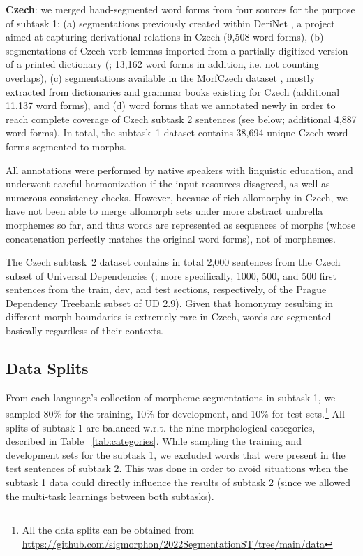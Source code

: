 \documentclass[11pt]{article}
\begin{document}
\textbf{Czech}: we merged hand-segmented word forms from four sources for the purpose of subtask 1:
(a) segmentations previously created within DeriNet \cite{derinet-2019}, a project aimed at capturing derivational relations in Czech  (9,508 word forms),
(b) segmentations of Czech verb lemmas imported from a partially digitized version of a printed dictionary (\citealt{slavickova-2017}; 13,162 word forms in addition, i.e. not counting overlaps),
(c) segmentations available in the MorfCzech dataset  \cite{morfoczech-data-2022}, mostly extracted from dictionaries and  grammar books existing for Czech (additional 11,137 word forms), and
(d) word forms that we annotated newly in order to reach complete coverage of Czech subtask 2 sentences (see below; additional 4,887 word forms). In total, the subtask~1 dataset contains 38,694 unique Czech word forms segmented to morphs.

All annotations were performed by native speakers with linguistic education, and underwent careful harmonization if the input resources disagreed, as well as numerous consistency checks. However, because of rich allomorphy in Czech, we have not been able to merge allomorph sets  under more abstract umbrella morphemes so far, and thus words are represented as sequences of morphs (whose concatenation perfectly matches the original word forms), not of morphemes. 

The Czech subtask~2 dataset contains in total 2,000 sentences from the Czech subset of Universal Dependencies (\citealt{ud-cl-2021}; more specifically, 1000, 500, and 500 first sentences from the train, dev, and test sections, respectively, of the Prague Dependency Treebank subset of UD 2.9). Given that homonymy resulting in different morph boundaries is extremely rare in Czech, words are segmented basically regardless of their contexts. 


\subsection{Data Splits}
From each language's collection of morpheme segmentations in subtask 1, we sampled 80\% for the training,  10\% for development, and 10\% for test sets.\footnote{All the data splits can be obtained from \url{ https://github.com/sigmorphon/2022SegmentationST/tree/main/data}} All splits of subtask 1 are balanced w.r.t. the nine morphological categories, described in Table~ \ref{tab:categories}. While sampling the training and development sets for the subtask 1, we excluded words that were present in the test sentences of subtask 2. This was done in order to avoid situations when the subtask 1 data could directly influence the results of subtask 2 (since we allowed the multi-task learnings between both subtasks).  
\end{document}
